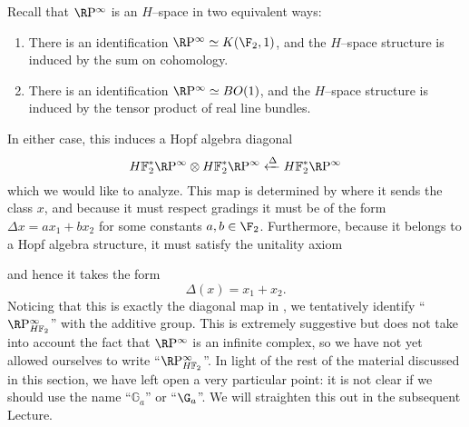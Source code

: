 \begin{example}\label{RPExampleFaulty}
Recall that $\RP^\infty$ is an $H$--space in two equivalent ways:
\begin{enumerate}
\item There is an identification $\RP^\infty \simeq K(\F_2, 1)$, and the $H$--space structure is induced by the sum on cohomology.
\item There is an identification $\RP^\infty \simeq BO(1)$, and the $H$--space structure is induced by the tensor product of real line bundles.
\end{enumerate}
In either case, this induces a Hopf algebra diagonal \[\HFtwo^* \RP^\infty \otimes \HFtwo^* \RP^\infty \xleftarrow\Delta \HFtwo^* \RP^\infty\] which we would like to analyze.  This map is determined by where it sends the class $x$, and because it must respect gradings it must be of the form $\Delta x = ax_1 + bx_2$ for some constants $a, b \in \F_2$.  Furthermore, because it belongs to a Hopf algebra structure, it must satisfy the unitality axiom
\begin{center}
\end{center}
and hence it takes the form \[\Delta(x) = x_1 + x_2.\]  Noticing that this is exactly the diagonal map in , we tentatively identify ``$\RP^\infty_{\HFtwo}$'' with the additive group.  This is extremely suggestive but does not take into account the fact that $\RP^\infty$ is an infinite complex, so we have not yet allowed ourselves to write ``$\RP^\infty_{\HFtwo}$''.  In light of the rest of the material discussed in this section, we have left open a very particular point: it is not clear if we should use the name ``$\mathbb G_a$'' or ``$\G_a$''.  We will straighten this out in the subsequent Lecture.
\end{example}








